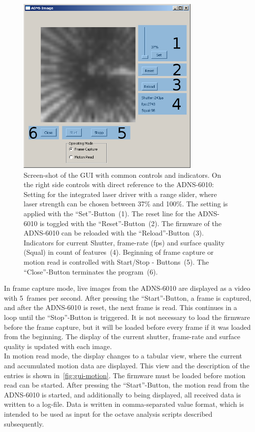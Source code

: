 \documentclass[12pt,a4paper]{article}
\begin{document}
\begin{figure}[htbp]
\begin{center}
\includegraphics[width=0.8\textwidth]{figures/gui-common.png}
\caption{\label{fig:gui-common}
Screen-shot of the GUI with common controls and indicators.
On the right side controls with direct reference to the ADNS-6010:
Setting for the integrated laser driver with a range slider, where laser strength can be chosen between 37\% and 100\%. The setting is applied with the ``Set''-Button~(1).
The reset line for the ADNS-6010 is toggled with the ``Reset''-Button~(2).
The firmware of the ADNS-6010 can be reloaded with the ``Reload''-Button~(3).
Indicators for current Shutter, frame-rate (fps) and surface quality (Squal) in count of features~(4).
Beginning of frame capture or motion read is controlled with Start/Stop - Buttons~(5).
The ``Close''-Button terminates the program~(6).
}
\end{center}
\end{figure}

In frame capture mode, live images from the ADNS-6010 are displayed as a video with 5~frames per second.
After pressing the ``Start''-Button, a frame is captured, and after the ADNS-6010 is reset, the next frame is read.
This continues in a loop until the ``Stop''-Button is triggered.
It is not necessary to load the firmware before the frame capture, but it will be loaded before every frame if it was loaded from the beginning.
The display of the current shutter, frame-rate and surface quality is updated with each image.\\
In motion read mode, the display changes to a tabular view, where the current and accumulated motion data are displayed.
This view and the description of the entries is shown in~\autoref{fig:gui-motion}.
The firmware must be loaded before motion read can be started.
After pressing the ``Start''-Button, the motion read from the ADNS-6010 is started, and additionally to being displayed, all received data is written to a log-file.
Data is written in comma-separated value format, which is intended to be used as input for the octave analysis scripts described subsequently.
\end{document}
